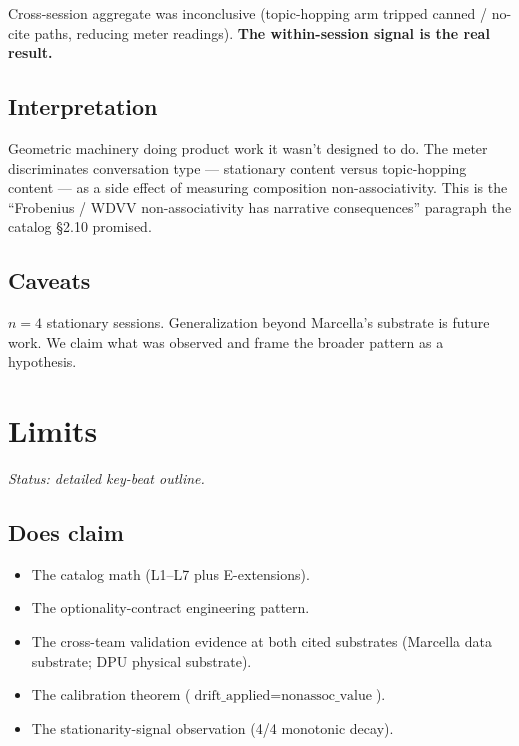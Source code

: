 \documentclass[11pt,letterpaper]{article}
\begin{document}
Cross-session aggregate was inconclusive (topic-hopping arm tripped
canned / no-cite paths, reducing meter readings). \textbf{The
within-session signal is the real result.}

\subsection{Interpretation}

Geometric machinery doing product work it wasn't designed to do. The
meter discriminates conversation type --- stationary content versus
topic-hopping content --- as a side effect of measuring composition
non-associativity. This is the ``Frobenius / WDVV non-associativity
has narrative consequences'' paragraph the catalog \S2.10 promised.

\subsection{Caveats}

$n = 4$ stationary sessions. Generalization beyond Marcella's
substrate is future work. We claim what was observed and frame the
broader pattern as a hypothesis.


\section{Limits}
\label{sec:limits}

\noindent\emph{Status: detailed key-beat outline.}

\subsection{Does claim}
\begin{itemize}[nosep]
\item The catalog math (L1--L7 plus E-extensions).
\item The optionality-contract engineering pattern.
\item The cross-team validation evidence at both cited substrates
  (Marcella data substrate; DPU physical substrate).
\item The calibration theorem
  ($\text{drift\_applied} = \text{nonassoc\_value}$).
\item The stationarity-signal observation (4/4 monotonic decay).
\end{itemize}
\end{document}
